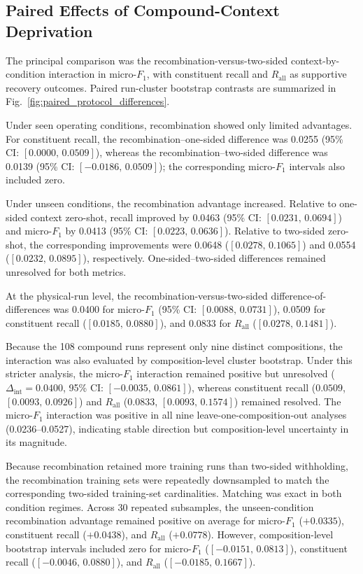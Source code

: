 \documentclass{ieeeaccess}
\begin{document}
\subsection{Paired Effects of Compound-Context Deprivation}
\label{subsec:context_condition_results}

The principal comparison was the recombination-versus-two-sided
context-by-condition interaction in micro-$F_1$, with constituent recall and
$R_{\mathrm{all}}$ as supportive recovery outcomes. Paired run-cluster
bootstrap contrasts are summarized in
Fig.~\ref{fig:paired_protocol_differences}.

Under seen operating conditions, recombination showed only limited advantages.
For constituent recall, the recombination--one-sided difference was 0.0255
(95\% CI: $[0.0000,\,0.0509]$), whereas the recombination--two-sided
difference was 0.0139 (95\% CI: $[-0.0186,\,0.0509]$); the corresponding
micro-$F_1$ intervals also included zero.

Under unseen conditions, the recombination advantage increased. Relative to
one-sided context zero-shot, recall improved by 0.0463
(95\% CI: $[0.0231,\,0.0694]$) and micro-$F_1$ by 0.0413
(95\% CI: $[0.0223,\,0.0636]$). Relative to two-sided zero-shot, the
corresponding improvements were 0.0648
($[0.0278,\,0.1065]$) and 0.0554
($[0.0232,\,0.0895]$), respectively. One-sided--two-sided differences
remained unresolved for both metrics.

At the physical-run level, the recombination-versus-two-sided
difference-of-differences was 0.0400 for micro-$F_1$
(95\% CI: $[0.0088,\,0.0731]$), 0.0509 for constituent recall
($[0.0185,\,0.0880]$), and 0.0833 for $R_{\mathrm{all}}$
($[0.0278,\,0.1481]$).

Because the 108 compound runs represent only nine distinct compositions, the
interaction was also evaluated by composition-level cluster bootstrap. Under
this stricter analysis, the micro-$F_1$ interaction remained positive but
unresolved
($\Delta_{\mathrm{int}}=0.0400$, 95\% CI:
$[-0.0035,\,0.0861]$), whereas constituent recall
($0.0509$, $[0.0093,\,0.0926]$) and $R_{\mathrm{all}}$
($0.0833$, $[0.0093,\,0.1574]$) remained resolved. The micro-$F_1$
interaction was positive in all nine leave-one-composition-out analyses
(0.0236--0.0527), indicating stable direction but composition-level
uncertainty in its magnitude. 

Because recombination retained more training runs than two-sided withholding,
the recombination training sets were repeatedly downsampled to match the
corresponding two-sided training-set cardinalities. Matching was exact in both
condition regimes. Across 30 repeated subsamples, the unseen-condition
recombination advantage remained positive on average for micro-$F_1$
($+0.0335$), constituent recall ($+0.0438$), and
$R_{\mathrm{all}}$ ($+0.0778$). However, composition-level bootstrap
intervals included zero for micro-$F_1$
($[-0.0151,\,0.0813]$), constituent recall
($[-0.0046,\,0.0880]$), and $R_{\mathrm{all}}$
($[-0.0185,\,0.1667]$).
\end{document}
